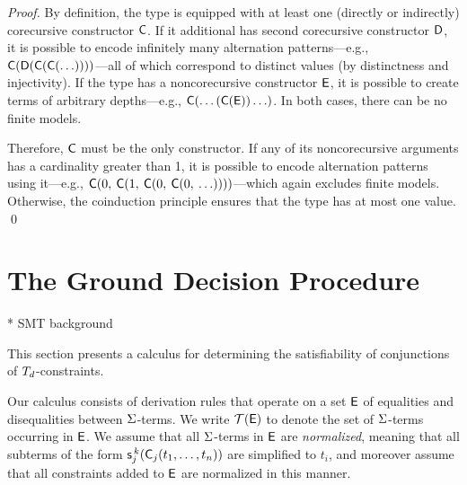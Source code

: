 \begin{proof}
By definition, the type is equipped with at least one (directly or indirectly)
corecursive constructor $\textsf{C}$. If it additional has second
corecursive constructor $\textsf{D}$, it is possible to encode infinitely many
alternation patterns---e.g.,
$\textsf{C}(\textsf{D}(\textsf{C}(\textsf{C}(\ldots))))$---all of which correspond
to distinct values (by distinctness and injectivity). If the type has a
noncorecursive constructor $\textsf{E}$, it is possible to create terms of
arbitrary depths---e.g., $\textsf{C}(\ldots(\textsf{C}(\textsf{E}))\ldots)$. In
both cases, there can be no finite models.

Therefore, $\textsf{C}$ must be the only constructor.
If any of its noncorecursive arguments has a cardinality greater than 1,
it is possible to encode alternation patterns using it---e.g.,
$\textsf{C}(0,\: \textsf{C}(1,\: \textsf{C}(0,\: \textsf{C}(0,\: \ldots))))$---which
again excludes finite models. Otherwise, the coinduction principle ensures
that the type has at most one value.
\qed
\end{proof}


\section{The Ground Decision Procedure} %
\label{sec:a-ground-decision-procedure-for-co-datatypes}

  * SMT background

This section presents a calculus for determining the satisfiability of conjunctions of $T_{d}$-constraints.

Our calculus consists of derivation rules that operate on a set $\mathsf{E}$ of equalities and disequalities between $\mathrm{\Sigma}$-terms.
We write $\mathcal{T}(\mathsf{E})$ to denote the set of $\mathrm{\Sigma}$-terms occurring in $\mathsf{E}$.
We assume that all $\mathrm{\Sigma}$-terms in $\mathsf{E}$ are \emph{normalized}, meaning that all subterms of the form $\textsf{s}^{\,k}_j( \textsf{C}_j(t_1,\ldots,t_n) )$
are simplified to $t_i$, and moreover assume that all %
constraints added to $\mathsf{E}$ are normalized in this manner.

